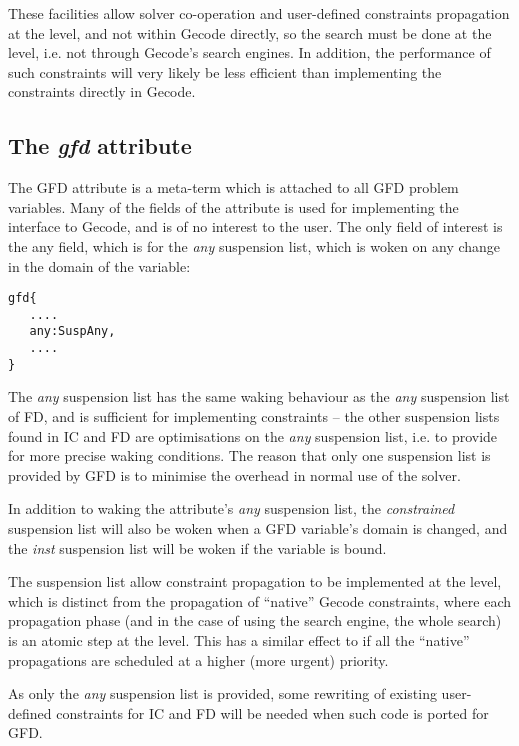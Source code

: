 These facilities allow solver co-operation and user-defined 
constraints propagation at the \eclipse level, and not within Gecode directly,
so the search must be done at the \eclipse level, i.e. not through Gecode's
search engines. In addition, the performance of such constraints will very
likely be less efficient than implementing the constraints directly in Gecode.

\subsection{The {\it gfd\/} attribute}

The GFD attribute is a meta-term which is attached to all GFD problem variables.
Many of the fields of the attribute is used for implementing the interface to
Gecode, and is of no interest to the user. The only field of interest is the
any field, which is for the {\it any\/} suspension list, which is woken on 
any change in the domain of the variable:

\begin{verbatim}
gfd{
   ....
   any:SuspAny,
   ....
}
\end{verbatim}

The {\it any\/} suspension list has the same waking behaviour as the 
{\it any\/} suspension
list of FD, and is sufficient for implementing constraints -- the other 
suspension lists found in IC and FD are optimisations on the {\it any\/} 
suspension list, i.e. to provide for more precise waking conditions. 
The reason that
only one suspension list is provided by GFD is to minimise the overhead in
normal use of the solver. 


In addition to waking the attribute's {\it any\/} suspension list, the 
{\it constrained\/}
suspension list will also be woken when a GFD variable's domain is changed,
and the {\it inst\/} suspension list will be woken if the variable is bound.

The suspension list allow constraint propagation to be implemented at the
\eclipse level, which is distinct from the propagation of ``native'' Gecode
constraints, where each propagation phase (and in the case of using the 
search engine, the whole search) is an atomic step at the \eclipse level. 
This has a similar effect to if all the ``native'' propagations are scheduled 
at a higher (more urgent) priority.
 
As only the {\it any\/} suspension list is provided, some rewriting of existing
user-defined constraints for IC and FD will be needed when such code is ported
for GFD.

